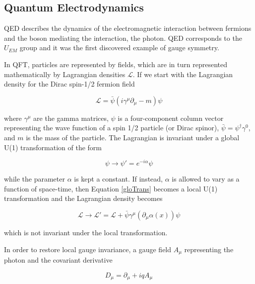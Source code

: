 \subsection{Quantum Electrodynamics}

QED describes the dynamics of the electromagnetic interaction between fermions and the boson mediating the interaction, the photon. QED corresponds to the $U_{EM}$ group and it was the first discovered example of gauge symmetry.%

In QFT, particles are represented by fields\cite{Peskin:1995ev}, which are in turn represented mathematically by Lagrangian densities $\mathcal{L}$. If we start with the Lagrangian density for the Dirac spin-1/2 fermion field\cite{wiki:diracfield}

\begin{equation}
\mathcal{L} = \bar{\psi}(i\gamma^{\mu}\partial_{\mu} - m)\psi
\end{equation}

where $\gamma^{\mu}$ are the gamma matrices\cite{wiki:gammam}, $\psi$ is a four-component column vector representing the wave function of a spin 1/2 particle (or Dirac spinor), $\bar{\psi}=\psi^{\dagger}\gamma^{0}$, and $m$ is the mass of the particle. The Lagrangian is invariant under a global U(1) transformation of the form

\begin{equation}
\label{gloTrans}
\psi \rightarrow \psi '= e^{-i\alpha}\psi
\end{equation}

while the parameter $\alpha$ is kept a constant. If instead, $\alpha$ is allowed to vary as a function of space-time, then Equation \ref{gloTrans} becomes a local U(1) transformation and the Lagrangian density becomes

\begin{equation}
\mathcal{L}\rightarrow \mathcal{L'} = \mathcal{L} + \bar{\psi}\gamma^{\mu}(\partial_{\mu}\alpha(x))\psi
\end{equation}

which is not invariant under the local transformation.

In order to restore local gauge invariance, a gauge field $A_{\mu}$ representing the photon and the covariant derivative 

\begin{equation}
D_{\mu} = \partial_{\mu} + iq A_{\mu}
\end{equation} 

